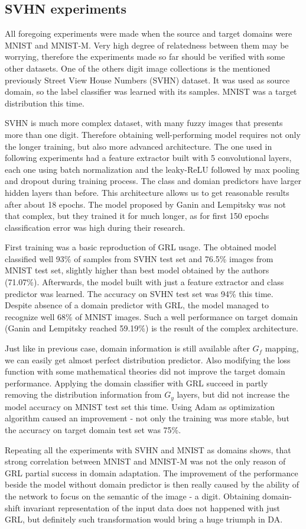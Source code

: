 \documentclass{article}
\begin{document}
\subsection{SVHN experiments}
All foregoing experiments were made when the source and target domains were MNIST and MNIST-M. Very high degree of relatedness between them may  be worrying, therefore the experiments made so far should be verified with some other datasets. One of the others digit image collections is the mentioned previously Street View House Numbers (SVHN) dataset. It was used as source domain, so the label classifier was learned with its samples. MNIST was a target distribution this time.
\par
SVHN is much more complex dataset, with many fuzzy images that presents more than one digit. Therefore obtaining well-performing model requires not only the longer training, but also more advanced architecture. The one used in following experiments had a feature extractor built with 5 convolutional layers, each one using batch normalization and the leaky-ReLU followed by max pooling and dropout during training process. The class and domian predictors have larger hidden layers than before. This architecture allows us to get reasonable results after about 18 epochs. The model proposed by Ganin and Lempitsky was not that complex, but they trained it for much longer, as for first 150 epochs classification error was high during their research.
\par
First training was a basic reproduction of GRL usage. The obtained model classified well 93\% of samples from SVHN test set and 76.5\% images from MNIST test set, slightly higher than best model obtained by the authors (71.07\%). Afterwards, the model built with just a feature extractor and class predictor was learned. The accuracy on SVHN test set was 94\% this time. Despite absence of a domain predictor with GRL, the model managed to recognize well 68\% of MNIST images. Such a well performance on target domain (Ganin and Lempitsky reached 59.19\%) is the result of the complex architecture.
\par
Just like in previous case, domain information is still available after $G_{f}$ mapping, we can easily get almost perfect distribution predictor. Also modifying the loss function with some mathematical theories did not improve the target domain performance. Applying the domain classifier with GRL succeed in partly removing the distribution information from $G_{y}$ layers, but did not increase the model accuracy on MNIST test set this time. Using Adam as optimization algorithm caused an improvement - not only the training was more stable, but the accuracy on target domain test set was 75\%.
\par
Repeating all the experiments with SVHN and MNIST as domains shows, that strong correlation between MNIST and MNIST-M was not the only reason of GRL partial success in domain adaptation. The improvement of the performance beside the model without domain predictor is then really caused by the ability of the network to focus on the semantic of the image - a digit. Obtaining domain-shift invariant representation of the input data does not happened with just GRL, but definitely such transformation would bring a huge triumph in DA.
\end{document}
